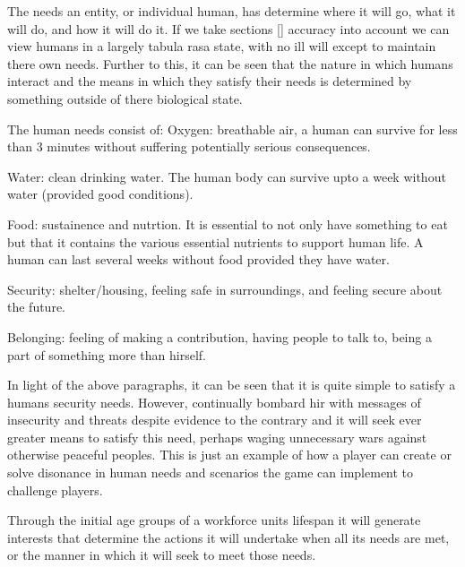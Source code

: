 The needs an entity, or individual human, has determine where it will go, what it will do, and how it will do it. If we take sections [] accuracy into account we can view humans in a largely tabula rasa state, with no ill will except to maintain there own needs. Further to this, it can be seen that the nature in which humans interact and the means in which they satisfy their needs is determined by something outside of there biological state. 

The human needs consist of:
Oxygen: breathable air, a human can survive for less than 3 minutes without suffering potentially serious consequences. 

Water: clean drinking water. The human body can survive upto a week without water (provided good conditions). 

Food: sustainence and nutrtion. It is essential to not only have something to eat but that it contains the various essential nutrients to support human life. A human can last several weeks without food provided they have water.

Security: shelter/housing, feeling safe in surroundings, and feeling secure about the future.

Belonging: feeling of making a contribution, having people to talk to, being a part of something more than hirself.

In light of the above paragraphs, it can be seen that it is quite simple to satisfy a humans security needs. However, continually bombard hir with messages of insecurity and threats despite evidence to the contrary and it will seek ever greater means to satisfy this need, perhaps waging unnecessary wars against otherwise peaceful peoples. This is just an example of how a player can create or solve disonance in human needs and scenarios the game can implement to challenge players.

Through the initial age groups of a workforce units lifespan it will generate interests that determine the actions it will undertake when all its needs are met, or the manner in which it will seek to meet those needs. 





